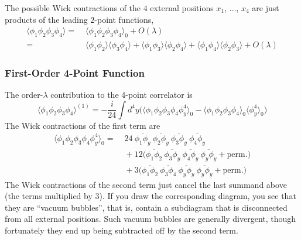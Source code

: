 \documentclass[12pt]{article}
\begin{document}
The possible Wick contractions of the $4$ external positions $x_1$,
$\dots$, $x_4$ are just products of the leading $2$-point functions,
\begin{equation}
  \begin{split}
    \langle \phi_1 \phi_2\phi_3 \phi_4 \rangle 
    =&\;
    \langle \phi_1 \phi_2\phi_3 \phi_4 \rangle_0 + O(\lambda) 
    \\ =&\;
    \langle \phi_1 \phi_2 \rangle
    \langle \phi_3 \phi_4 \rangle +
    \langle \phi_1 \phi_3 \rangle
    \langle \phi_2 \phi_4 \rangle +
    \langle \phi_1 \phi_4 \rangle
    \langle \phi_2 \phi_3 \rangle +
    O(\lambda)
  \end{split}
\end{equation}


\subsubsection{First-Order 4-Point Function}

The order-$\lambda$ contribution to the 4-point correlator is
\begin{equation}
  \langle \phi_1 \phi_2 \phi_3 \phi_4 \rangle^{(1)} = 
  - \frac{i}{24} \int d^4y \Big(
  \langle \phi_1 \phi_2 \phi_3\phi_4 \phi_y^4 \rangle_0 - 
  \langle \phi_1 \phi_2 \phi_3 \phi_4  \rangle_0 
  \langle \phi_y^4 \rangle_0 
  \Big)
\end{equation}
The Wick contractions of the first term are
\begin{equation}
  \begin{split}
    \langle \phi_1 \phi_2 \phi_3 \phi_4 \phi_y^4 \rangle_0 =&\;
    24~
    \overline{\phi_1 \phi_y}~
    \overline{\phi_2 \phi_y}~
    \overline{\phi_3 \phi_y}~
    \overline{\phi_4 \phi_y}
    \\ &\;
    + 12\Big(
    \overline{\phi_1 \phi_2}~
    \overline{\phi_3 \phi_y}~
    \overline{\phi_4 \phi_y}~
    \overline{\phi_y \phi_y}
    + \text{perm.}
    \Big)
    \\ &\;
    + 3\Big(
    \overline{\phi_1 \phi_2}~
    \overline{\phi_3 \phi_4}~
    \overline{\phi_y \phi_y}~
    \overline{\phi_y \phi_y}
    + \text{perm.}
    \Big)
  \end{split}
\end{equation}
The Wick contractions of the second term just cancel the last summand
above (the terms multiplied by $3$). If you draw the corresponding
diagram, you see that they are ``vacuum bubbles'', that is, contain a
subdiagram that is disconnected from all external positions. Such
vacuum bubbles are generally divergent, though fortunately they end up
being subtracted off by the second term. 
\end{document}
